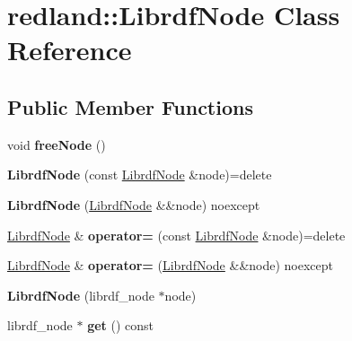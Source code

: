 \hypertarget{classredland_1_1LibrdfNode}{}\section{redland\+:\+:Librdf\+Node Class Reference}
\label{classredland_1_1LibrdfNode}
\subsection*{Public Member Functions}
\begin{DoxyCompactItemize}
\item 
\mbox{\label{classredland_1_1LibrdfNode_a28f6ce060bddf7e1cb88d17d4d4ea81a}} 
void {\bfseries free\+Node} ()
\item 
\mbox{\label{classredland_1_1LibrdfNode_a669557dc1240dc17c3a7a3a61d2400d9}} 
{\bfseries Librdf\+Node} (const \hyperlink{classredland_1_1LibrdfNode}{Librdf\+Node} \&node)=delete
\item 
\mbox{\label{classredland_1_1LibrdfNode_a822ce6a4221315abe5768b278b83d0e5}} 
{\bfseries Librdf\+Node} (\hyperlink{classredland_1_1LibrdfNode}{Librdf\+Node} \&\&node) noexcept
\item 
\mbox{\label{classredland_1_1LibrdfNode_abce52c34cc89e48886cde07aa5e113c9}} 
\hyperlink{classredland_1_1LibrdfNode}{Librdf\+Node} \& {\bfseries operator=} (const \hyperlink{classredland_1_1LibrdfNode}{Librdf\+Node} \&node)=delete
\item 
\mbox{\label{classredland_1_1LibrdfNode_a9de3a69b00958b2bb50646dbf0aa8d7e}} 
\hyperlink{classredland_1_1LibrdfNode}{Librdf\+Node} \& {\bfseries operator=} (\hyperlink{classredland_1_1LibrdfNode}{Librdf\+Node} \&\&node) noexcept
\item 
\mbox{\label{classredland_1_1LibrdfNode_a200c7a67088e66d6fc73f52bdb51d2e9}} 
{\bfseries Librdf\+Node} (librdf\+\_\+node $\ast$node)
\item 
\mbox{\label{classredland_1_1LibrdfNode_a33162ea36efe451c100325816cf8613f}} 
librdf\+\_\+node $\ast$ {\bfseries get} () const

\end{DoxyCompactItemize}
